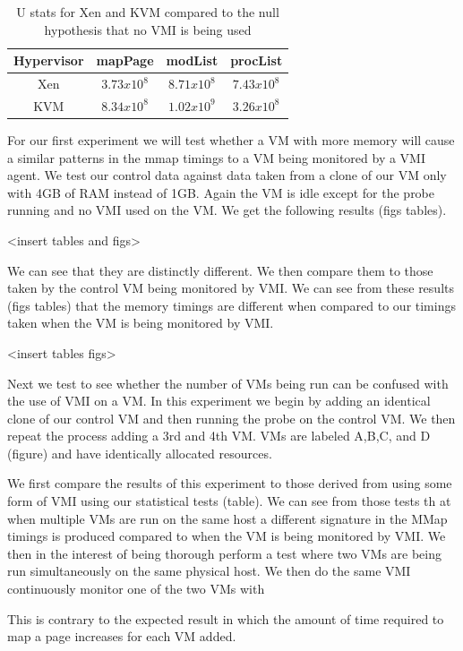 \begin{table}[p!]
		\centering
		\begin{tabular}{| c | c | c | c |}
			\hline
			Hypervisor & mapPage & modList & procList  \\ \hline
			Xen & $3.73x10^{8}$ & $8.71x10^{8}$ & $7.43x10^{8}$  \\  \hline
			KVM & $8.34x10^{8}$ & $1.02x10^{9}$ & $3.26x10^{8}$ \\  
		\end{tabular}
		\label{MannWhitneyMMap1}
		\caption{U stats for Xen and KVM compared to the null hypothesis that no VMI is being used}
	\end{table}


For our first experiment we will test whether a VM with more memory will cause a similar patterns in the mmap timings to a VM  being monitored by a VMI agent. We test our control data against data taken from a clone of our VM only with 4GB of RAM instead of 1GB. Again the VM is idle except for the probe running and no VMI used on the VM. We get the following results (figs tables). 

<insert tables and figs>


We can see that they are distinctly different. We then compare them to those taken by the control VM being monitored by VMI. We can see from these results (figs tables) that the memory timings are different when compared to our timings taken when the VM is being monitored by VMI.

<insert tables figs> 


Next we test to see whether the number of VMs being run can be confused with the use of VMI on a VM. In this experiment we begin by adding an identical clone of our control VM and then running the probe on the control VM. We then repeat the process adding a 3rd and 4th VM. VMs are labeled A,B,C, and D (figure) and have identically allocated resources. 

We first compare the results of this experiment to those derived from using some form of VMI using our statistical tests (table). We can see from those tests th
at when multiple VMs are run on the same host a different signature in the MMap timings is produced compared to when the VM is being monitored by VMI.  We then in the interest of being thorough perform a test where two VMs are being run simultaneously on the same physical host. We then do the same VMI continuously monitor one of the two VMs with 

This is contrary to the expected result in which the amount of time required to map a page increases for each VM added. 